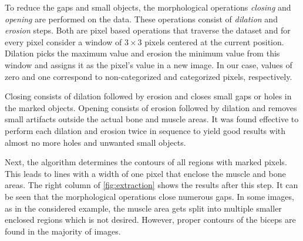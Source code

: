To reduce the gaps and small objects, the morphological operations \emph{closing} and \emph{opening} are performed on the data. These operations consist of \emph{dilation} and \emph{erosion} steps. Both are pixel based operations that traverse the dataset and for every pixel consider a window of $3\times 3$ pixels centered at the current position. Dilation picks the maximum value and erosion the minimum value from this window and assigns it as the pixel's value in a new image. In our case, values of zero and one correspond to non-categorized and categorized pixels, respectively.

Closing consists of dilation followed by erosion and closes small gaps or holes in the marked objects. Opening consists of erosion followed by dilation and removes small artifacts outside the actual bone and muscle areas. It was found effective to perform each dilation and erosion twice in sequence to yield good results with almost no more holes and unwanted small objects.

Next, the algorithm determines the contours of all regions with marked pixels. This leads to lines with a width of one pixel that enclose the muscle and bone areas. The right column of \cref{fig:extraction} shows the results after this step. It can be seen that the morphological operations close numerous gaps. In some images, as in the considered example, the muscle area gets split into multiple smaller enclosed regions which is not desired. However, proper contours of the biceps are found in the majority of images. 

